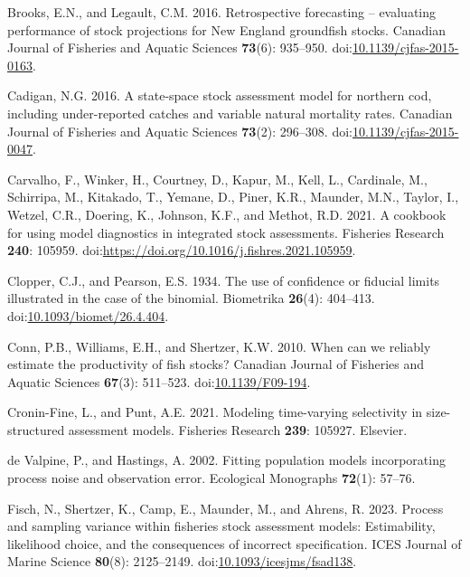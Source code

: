 \documentclass[
  12pt,
]{article}
\newlength{\cslhangindent}
\newlength{\cslentryspacingunit} %
\newenvironment{CSLReferences}[2] %
 {%
  \setlength{\parindent}{0pt}
  \ifodd #1
  \let\oldpar\par
  \def\par{\hangindent=\cslhangindent\oldpar}
  \fi
  \setlength{\parskip}{#2\cslentryspacingunit}
 }%
 {}
\begin{document}
\begin{CSLReferences}{1}{0}
\leavevmode{}%
Brooks, E.N., and Legault, C.M. 2016. Retrospective forecasting --
evaluating performance of stock projections for {N}ew {E}ngland
groundfish stocks. Canadian Journal of Fisheries and Aquatic Sciences
\textbf{73}(6): 935--950.
doi:\href{https://doi.org/10.1139/cjfas-2015-0163}{10.1139/cjfas-2015-0163}.

\leavevmode{}%
Cadigan, N.G. 2016. A state-space stock assessment model for northern
cod, including under-reported catches and variable natural mortality
rates. Canadian Journal of Fisheries and Aquatic Sciences
\textbf{73}(2): 296--308.
doi:\href{https://doi.org/10.1139/cjfas-2015-0047}{10.1139/cjfas-2015-0047}.

\leavevmode{}%
Carvalho, F., Winker, H., Courtney, D., Kapur, M., Kell, L., Cardinale,
M., Schirripa, M., Kitakado, T., Yemane, D., Piner, K.R., Maunder, M.N.,
Taylor, I., Wetzel, C.R., Doering, K., Johnson, K.F., and Methot, R.D.
2021. A cookbook for using model diagnostics in integrated stock
assessments. Fisheries Research \textbf{240}: 105959.
doi:\url{https://doi.org/10.1016/j.fishres.2021.105959}.

\leavevmode{}%
Clopper, C.J., and Pearson, E.S. 1934. The use of confidence or fiducial
limits illustrated in the case of the binomial. Biometrika
\textbf{26}(4): 404--413.
doi:\href{https://doi.org/10.1093/biomet/26.4.404}{10.1093/biomet/26.4.404}.

\leavevmode{}%
Conn, P.B., Williams, E.H., and Shertzer, K.W. 2010. When can we
reliably estimate the productivity of fish stocks? Canadian Journal of
Fisheries and Aquatic Sciences \textbf{67}(3): 511--523.
doi:\href{https://doi.org/10.1139/F09-194}{10.1139/F09-194}.

\leavevmode{}%
Cronin-Fine, L., and Punt, A.E. 2021. Modeling time-varying selectivity
in size-structured assessment models. Fisheries Research \textbf{239}:
105927. Elsevier.

\leavevmode{}%
de Valpine, P., and Hastings, A. 2002. Fitting population models
incorporating process noise and observation error. Ecological Monographs
\textbf{72}(1): 57--76.

\leavevmode{}%
Fisch, N., Shertzer, K., Camp, E., Maunder, M., and Ahrens, R. 2023.
Process and sampling variance within fisheries stock assessment models:
Estimability, likelihood choice, and the consequences of incorrect
specification. ICES Journal of Marine Science \textbf{80}(8):
2125--2149.
doi:\href{https://doi.org/10.1093/icesjms/fsad138}{10.1093/icesjms/fsad138}.


\end{CSLReferences}
\end{document}
